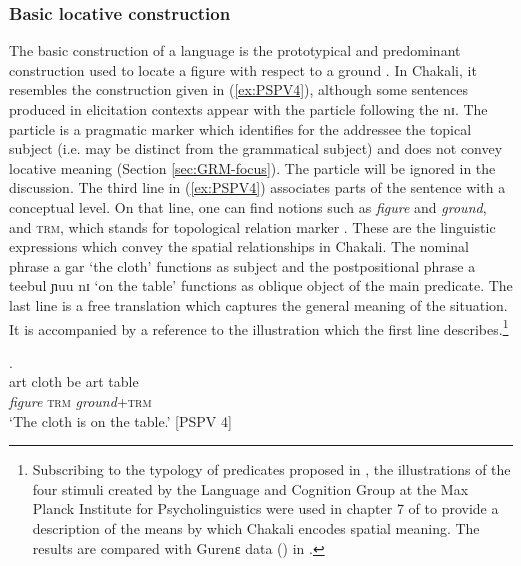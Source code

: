 % 

\subsubsection{Basic locative construction}
\label{sec:SPA-blc}


The basic  construction  of a language 
is  the prototypical  and predominant construction used to locate a figure with 
respect to a ground \citep[15]{Levi06}. In Chakali, it resembles the 
construction given in (\ref{ex:PSPV4}), although some sentences produced in 
elicitation contexts appear with the  particle following the 
 {\sls nɪ}.  The  particle  is a pragmatic 
marker which identifies for the addressee the topical subject (i.e. may be 
distinct from the grammatical subject) and does not convey locative meaning 
(Section \ref{sec:GRM-focus}). The  particle will be ignored in the 
discussion. The third  line  in (\ref{ex:PSPV4}) associates parts of the 
sentence with a conceptual level. On that line, one can find notions such as 
{\it figure} and {\it ground},  and \textsc{trm}, which stands for   topological relation marker 
\citep[see][]{Brin12}. These are the linguistic expressions which convey  the 
spatial relationships in Chakali.  The nominal phrase {\sls a gar} `the cloth'  
functions as subject and the postpositional phrase {\sls a teebul ɲuu nɪ} `on the table' 
functions as  oblique object  of the main predicate. The last line is a free 
translation which captures  the general meaning of the situation. It is 
accompanied by a reference to the illustration which the first line 
describes.\footnote{Subscribing to the typology of  predicates proposed in \citet{amek07b}, the illustrations of the  four stimuli created by the Language and Cognition Group at the Max Planck Institute for Psycholinguistics \citep{bowe93, amek99, meir01a, meir01b} were used in chapter 7 of \citet{brin11} to provide a description of the means by which Chakali encodes spatial
meaning. The results are compared with Gurenɛ data () in \citet{Brin12}.}



\begin{exe}
\ex\label{ex:PSPV4}
\glll  [à gár] [ságá] [à {téébùl ɲúù} nɪ̀].\\
{\sc art} cloth be {\sc art}  {table {\reln}}  {\postp}\\
 \textit{figure} {} \textsc{trm}  {} {\textit{ground}+\textsc{trm}}  {} \\
\glt `The cloth is on the table.' [PSPV 4]
\end{exe}


